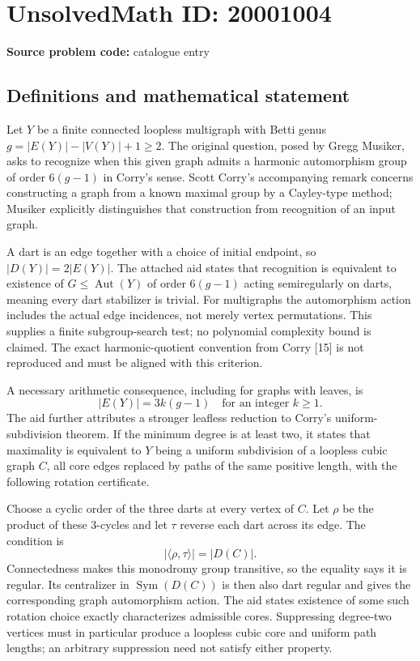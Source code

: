 \documentclass[11pt]{article}
\begin{document}
\section*{UnsolvedMath ID: 20001004}
\textbf{Source problem code:} catalogue entry
\subsection{Definitions and mathematical statement}
Let $Y$ be a finite connected loopless multigraph with Betti genus $g=|E(Y)|-|V(Y)|+1\ge2$. The original question, posed by Gregg Musiker, asks to recognize when this given graph admits a harmonic automorphism group of order $6(g-1)$ in Corry's sense. Scott Corry's accompanying remark concerns constructing a graph from a known maximal group by a Cayley-type method; Musiker explicitly distinguishes that construction from recognition of an input graph.

A dart is an edge together with a choice of initial endpoint, so $|D(Y)|=2|E(Y)|$. The attached aid states that recognition is equivalent to existence of $G\le\operatorname{Aut}(Y)$ of order $6(g-1)$ acting semiregularly on darts, meaning every dart stabilizer is trivial. For multigraphs the automorphism action includes the actual edge incidences, not merely vertex permutations. This supplies a finite subgroup-search test; no polynomial complexity bound is claimed. The exact harmonic-quotient convention from Corry [15] is not reproduced and must be aligned with this criterion.

A necessary arithmetic consequence, including for graphs with leaves, is
\[
|E(Y)|=3k(g-1)\quad\text{for an integer }k\ge1.
\]
The aid further attributes a stronger leafless reduction to Corry's uniform-subdivision theorem. If the minimum degree is at least two, it states that maximality is equivalent to $Y$ being a uniform subdivision of a loopless cubic graph $C$, all core edges replaced by paths of the same positive length, with the following rotation certificate.

Choose a cyclic order of the three darts at every vertex of $C$. Let $\rho$ be the product of these $3$-cycles and let $\tau$ reverse each dart across its edge. The condition is
\[
|\langle\rho,\tau\rangle|=|D(C)|.
\]
Connectedness makes this monodromy group transitive, so the equality says it is regular. Its centralizer in $\operatorname{Sym}(D(C))$ is then also dart regular and gives the corresponding graph automorphism action. The aid states existence of some such rotation choice exactly characterizes admissible cores. Suppressing degree-two vertices must in particular produce a loopless cubic core and uniform path lengths; an arbitrary suppression need not satisfy either property.
\end{document}
